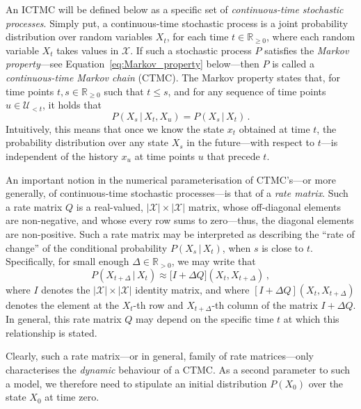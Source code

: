 \documentclass[twoside,11pt]{article}
\newcommand{\reals}{\mathbb{R}}
\newcommand{\realspos}{\reals_{>0}}
\newcommand{\realsnonneg}{\reals_{\geq 0}}
\newcommand{\states}{\mathcal{X}}
\begin{document}
An ICTMC will be defined below as a specific set of \emph{continuous-time stochastic processes}. Simply put, a continuous-time stochastic process is a joint probability distribution over random variables $X_t$, for each time $t\in\realsnonneg$, where each random variable $X_t$ takes values in $\states$. If such a stochastic process $P$ satisfies the \emph{Markov property}---see Equation~\eqref{eq:Markov_property} below---then $P$ is called a \emph{continuous-time Markov chain} (CTMC). The Markov property states that, for time points $t,s\in\realsnonneg$ such that $t\leq s$, and for any sequence of time points $u\in\mathcal{U}_{<t}$, it holds that
\begin{equation}\label{eq:Markov_property}
P(X_s\,\vert\,X_t,X_u) = P(X_s\,\vert\,X_t)\,.
\end{equation}
Intuitively, this means that once we know the state $x_t$ obtained at time $t$, the probability distribution over any state $X_s$ in the future---with respect to $t$---is independent of the history $x_u$ at time points $u$ that precede $t$.

An important notion in the numerical parameterisation of CTMC's---or more generally, of continuous-time stochastic processes---is that of a \emph{rate matrix}. Such a rate matrix $Q$ is a real-valued, $\lvert\states\rvert\times\lvert\states\rvert$ matrix, whose off-diagonal elements are non-negative, and whose every row sums to zero---thus, the diagonal elements are non-positive. Such a rate matrix may be interpreted as describing the ``rate of change'' of the conditional probability $P(X_s\,\vert\,X_t)$, when $s$ is close to $t$. Specifically, for small enough $\Delta\in\realspos$, we may write that
\begin{equation*}
P(X_{t+\Delta}\,\vert\,X_t) \approx \bigl[I + \Delta Q\bigr](X_t, X_{t+\Delta})\,,
\end{equation*}
where $I$ denotes the $\lvert\states\rvert\times\lvert\states\rvert$ identity matrix, and where $[I + \Delta Q](X_t,X_{t+\Delta})$ denotes the element at the $X_t$-th row and $X_{t+\Delta}$-th column of the matrix $I + \Delta Q$. In general, this rate matrix $Q$ may depend on the specific time $t$ at which this relationship is stated.

Clearly, such a rate matrix---or in general, family of rate matrices---only characterises the \emph{dynamic} behaviour of a CTMC. As a second parameter to such a model, we therefore need to stipulate an initial distribution $P(X_0)$ over the state $X_0$ at time zero.
\end{document}
